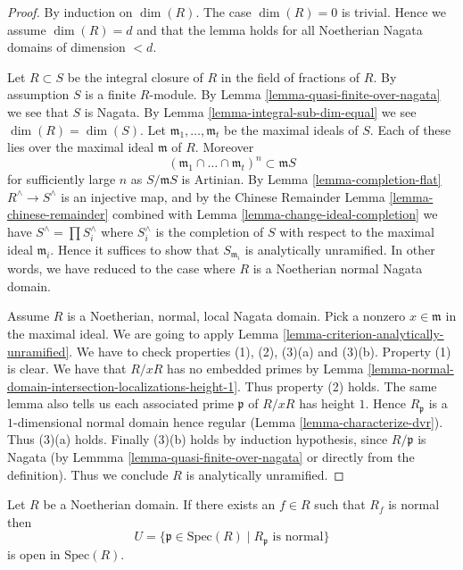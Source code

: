 \begin{proof}
By induction on $\dim(R)$.
The case $\dim(R) = 0$ is trivial. Hence we assume $\dim(R) = d$ and that
the lemma holds for all Noetherian Nagata domains of dimension $< d$.

\medskip\noindent
Let $R \subset S$ be the integral closure
of $R$ in the field of fractions of $R$. By assumption $S$ is a finite
$R$-module. By Lemma \ref{lemma-quasi-finite-over-nagata} we see that
$S$ is Nagata. By Lemma \ref{lemma-integral-sub-dim-equal} we see
$\dim(R) = \dim(S)$.
Let $\mathfrak m_1, \ldots, \mathfrak m_t$ be the maximal
ideals of $S$. Each of these lies over the maximal ideal $\mathfrak m$
of $R$. Moreover
$$
(\mathfrak m_1 \cap \ldots \cap \mathfrak m_t)^n \subset \mathfrak mS 
$$
for sufficiently large $n$ as $S/\mathfrak mS$ is Artinian.
By Lemma \ref{lemma-completion-flat} $R^\wedge \to S^\wedge$
is an injective map, and by the Chinese Remainder
Lemma \ref{lemma-chinese-remainder} combined with
Lemma \ref{lemma-change-ideal-completion} we have
$S^\wedge = \prod S^\wedge_i$ where $S^\wedge_i$
is the completion of $S$ with respect to the maximal ideal $\mathfrak m_i$.
Hence it suffices to show that $S_{\mathfrak m_i}$ is analytically unramified.
In other words, we have reduced to the case where $R$ is a Noetherian
normal Nagata domain.

\medskip\noindent
Assume $R$ is a Noetherian, normal, local Nagata domain.
Pick a nonzero $x \in \mathfrak m$ in the maximal ideal.
We are going to apply Lemma \ref{lemma-criterion-analytically-unramified}.
We have to check properties (1), (2), (3)(a) and (3)(b).
Property (1) is clear.
We have that $R/xR$ has no embedded primes by
Lemma \ref{lemma-normal-domain-intersection-localizations-height-1}.
Thus property (2) holds. The same lemma also tells us each associated
prime $\mathfrak p$ of $R/xR$ has height $1$.
Hence $R_{\mathfrak p}$ is a $1$-dimensional normal domain
hence regular (Lemma \ref{lemma-characterize-dvr}). Thus (3)(a) holds.
Finally (3)(b) holds by induction hypothesis, since
$R/\mathfrak p$ is Nagata (by Lemmma \ref{lemma-quasi-finite-over-nagata}
or directly from the definition).
Thus we conclude $R$ is analytically unramified.
\end{proof}

\begin{lemma}
\label{lemma-openness-normal-locus}
Let $R$ be a Noetherian domain.
If there exists an $f \in R$ such that $R_f$ is normal
then
$$
U = \{\mathfrak p \in \text{Spec}(R) \mid R_{\mathfrak p} \text{ is normal}\}
$$
is open in $\text{Spec}(R)$.
\end{lemma}

